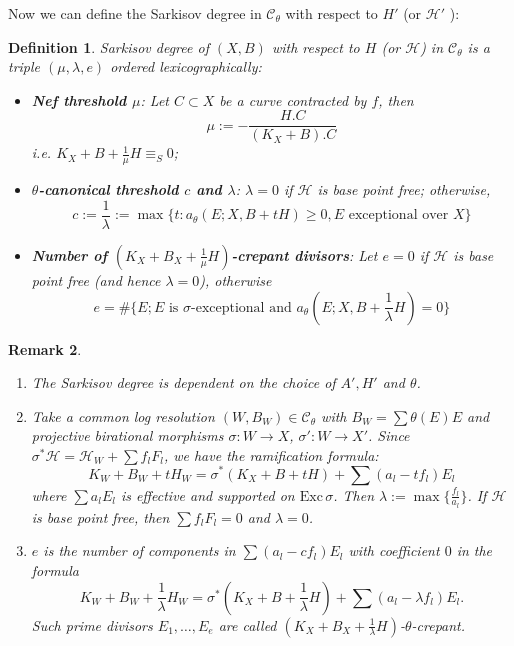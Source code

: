 \documentclass[11pt]{amsart}
\newtheorem{defn}{Definition}[section]
\newtheorem{rmk}[defn]{Remark}
\begin{document}
Now we can define the Sarkisov degree in $\mathcal{C}_{\theta}$ with respect to $H'$ (or $\mathcal{H}'$ ):
\begin{defn}\label{sarkisovdegree}
  \cite[Definition 3.8]{brunoLogSarkisovProgram1995}
  Sarkisov degree of $ (X,B) $ with respect to $ H $ (or $ \mathcal{H} $) in $ \mathcal{C}_\theta $ is a triple $ (\mu,\lambda,e) $ ordered lexicographically:
  \begin{itemize}
    \item \textbf{Nef threshold $ \mu $}: Let $ C\subset X  $ be a curve contracted by $ f $, then 
      \[ \mu:=-\frac{H.C}{(K_X+B).C} \]
      i.e. $ K_X+B+\frac{1}{\mu} H \equiv_S0$;
    \item \textbf{$ \theta $-canonical threshold $c$ and $ \lambda $}: $\lambda=0$ if $ \mathcal{H} $ is base point free; otherwise,
      \[ c:=\frac{1}{\lambda}:=\max\{t:a_{\theta}(E;X,B+tH)\geqslant 0 ,E\text{ exceptional over }X \}\] 
    \item \textbf{Number of $(K_{X}+B_{X}+\frac{1}{\mu}H)$-crepant divisors}: Let $ e=0 $ if $ \mathcal{H} $ is base point free (and hence $ \lambda=0 $), otherwise 
      \[ e=\#\{E; E \text{ is }\sigma\text{-exceptional and } a_{\theta}(E;X,B+\frac{1}{\lambda} H)=0 \} \]
  \end{itemize}
\end{defn}
\begin{rmk} 
 \begin{enumerate}
    \item  The Sarkisov degree is dependent on the choice of  $A', H'$ and  $\theta$.
   \item Take a common log resolution  $ (W,B_W)\in \mathcal{C}_\theta $ with $ B_W=\sum \theta(E)E $ and projective birational morphisms $ \sigma:W\to X $, $ \sigma':W\to X' $. Since $\sigma^*\mathcal{H}=\mathcal{H}_W+\sum f_{l}F_{l}$, we have the ramification formula:
      \[ K_W+B_W+tH_W=\sigma^*(K_X+B+tH)+\sum(a_l-tf_l)E_l \]
      where $ \sum a_lE_l $ is effective and supported on $ \mathrm{Exc}\,\sigma $. Then $\lambda:=\max\{ \frac{f_l}{a_l}\}$. If $ \mathcal{H} $ is base point free, then $ \sum f_lF_l=0 $ and $\lambda=0  $.
      \item   $ e $ is the number of components in $\sum(a_l-cf_l)E_l$ with coefficient $ 0 $ in the formula
      \[ K_W+B_W+\frac{1}{\lambda} H_W=\sigma^*(K_X+B+\frac{1}{\lambda} H)+\sum(a_l-\lambda f_l)E_l .\]
      Such prime divisors $E_{1},\ldots, E_{e}$ are called $(K_{X}+B_{X}+\frac{1}{\lambda}H)$-$\theta$-crepant.
 \end{enumerate} 
\end{rmk}
\end{document}
